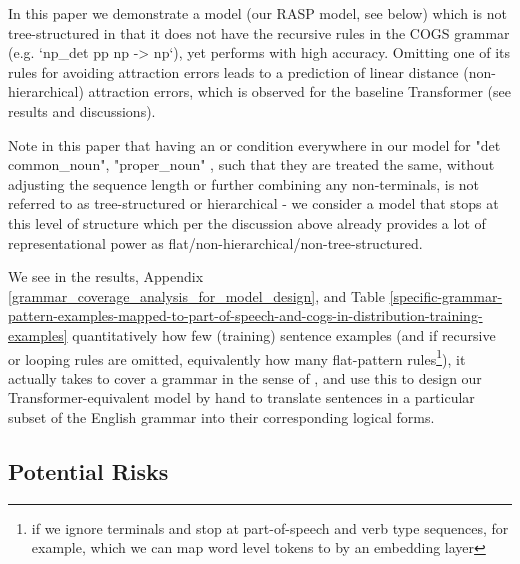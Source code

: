 \documentclass[11pt]{article}
\begin{document}
{\begin{footnotesize}
In this paper we demonstrate a model (our RASP model, see below) which is not tree-structured in that it does not have the recursive rules in the COGS grammar (e.g. `np\_det pp np -> np`), yet performs with high accuracy. Omitting one of its rules for avoiding attraction errors leads to a prediction of linear distance (non-hierarchical) attraction errors, which is observed for the baseline \cite{Wu2023} Transformer (see results and discussions).
\end{footnotesize}
}

Note in this paper that having an or condition everywhere in our model for "det common\_noun", "proper\_noun" , such that they are treated the same, without adjusting the sequence length or further combining any non-terminals, is not referred to as tree-structured or hierarchical - we consider a model that stops at this level of structure which per the discussion above already provides a lot of representational power as flat/non-hierarchical/non-tree-structured.

We see in the results, Appendix \ref{grammar_coverage_analysis_for_model_design}, and Table \ref{specific-grammar-pattern-examples-mapped-to-part-of-speech-and-cogs-in-distribution-training-examples}  quantitatively how few (training) sentence examples (and if recursive or looping rules are omitted, equivalently how many flat-pattern rules\footnote{if we ignore terminals and stop at part-of-speech and verb type sequences, for example, which we can map word level tokens to by an embedding layer}), it actually takes to cover a grammar in the sense of \cite{fuzzingbook2023:GrammarCoverageFuzzer}, and use this to design our Transformer-equivalent model by hand to translate sentences in a particular subset of the English grammar into their corresponding logical forms.

\subsection{Potential Risks}
\label{potential_risks}
\end{document}
